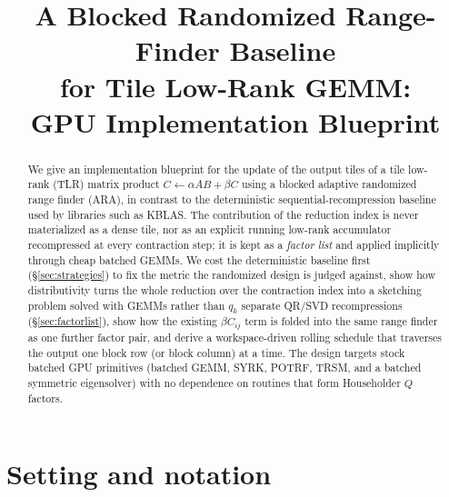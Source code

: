 \documentclass[11pt]{article}
\title{A Blocked Randomized Range-Finder Baseline\\
for Tile Low-Rank GEMM:\\
GPU Implementation Blueprint}
\author{}
\date{}
\begin{document}
\maketitle

\begin{abstract}
We give an implementation blueprint for the update of the output tiles of a tile
low-rank (TLR) matrix product $C\leftarrow\alpha AB+\beta C$ using a blocked
adaptive randomized range finder (ARA), in contrast to the deterministic
sequential-recompression baseline used by libraries such as KBLAS. The
contribution of the reduction index is never materialized as a dense tile, nor
as an explicit running low-rank accumulator recompressed at every contraction
step; it is kept as a \emph{factor list} and applied implicitly through cheap
batched GEMMs. We cost the deterministic baseline first (\S\ref{sec:strategies})
to fix the metric the randomized design is judged against, show how
distributivity turns the whole reduction over the contraction index into a
sketching problem solved with GEMMs rather than $q_k$ separate QR/SVD
recompressions (\S\ref{sec:factorlist}), show how the existing $\beta C_{ij}$
term is folded into the same range finder as one further factor pair, and
derive a workspace-driven rolling schedule that traverses the output one block
row (or block column) at a time. The design targets stock batched GPU
primitives (batched GEMM, SYRK, POTRF, TRSM, and a batched symmetric
eigensolver) with no dependence on routines that form Householder $Q$ factors.
\end{abstract}

\tableofcontents

\section{Setting and notation}
\label{sec:setting}
\end{document}
